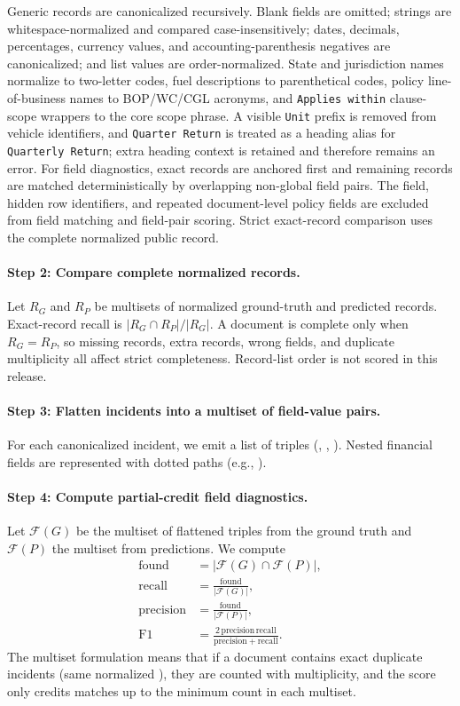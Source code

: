 Generic records are canonicalized recursively. Blank fields are omitted; strings are whitespace-normalized and compared case-insensitively; dates, decimals, percentages, currency values, and accounting-parenthesis negatives are canonicalized; and list values are order-normalized. State and jurisdiction names normalize to two-letter codes, fuel descriptions to parenthetical codes, policy line-of-business names to BOP/WC/CGL acronyms, and \texttt{Applies within} clause-scope wrappers to the core scope phrase. A visible \texttt{Unit} prefix is removed from vehicle identifiers, and \texttt{Quarter Return} is treated as a heading alias for \texttt{Quarterly Return}; extra heading context is retained and therefore remains an error. For field diagnostics, exact records are anchored first and remaining records are matched deterministically by overlapping non-global field pairs. The  field, hidden row identifiers, and repeated document-level policy fields are excluded from field matching and field-pair scoring. Strict exact-record comparison uses the complete normalized public record.

\paragraph{Step 2: Compare complete normalized records.}
Let $R_G$ and $R_P$ be multisets of normalized ground-truth and predicted records. Exact-record recall is $|R_G \cap R_P|/|R_G|$. A document is complete only when $R_G=R_P$, so missing records, extra records, wrong fields, and duplicate multiplicity all affect strict completeness. Record-list order is not scored in this release.

\paragraph{Step 3: Flatten incidents into a multiset of field-value pairs.}
For each canonicalized incident, we emit a list of triples (, , ). Nested financial fields are represented with dotted paths (e.g., ).

\paragraph{Step 4: Compute partial-credit field diagnostics.}
Let $\mathcal{F}(G)$ be the multiset of flattened triples from the ground truth and $\mathcal{F}(P)$ the multiset from predictions. We compute
\begin{align}
\mathrm{found} &= |\mathcal{F}(G) \cap \mathcal{F}(P)|,\\
\mathrm{recall} &= \frac{\mathrm{found}}{|\mathcal{F}(G)|},\\
\mathrm{precision} &= \frac{\mathrm{found}}{|\mathcal{F}(P)|},\\
\mathrm{F1} &= \frac{2\,\mathrm{precision}\,\mathrm{recall}}{\mathrm{precision}+\mathrm{recall}}.
\end{align}
The multiset formulation means that if a document contains exact duplicate incidents (same normalized ), they are counted with multiplicity, and the score only credits matches up to the minimum count in each multiset.

